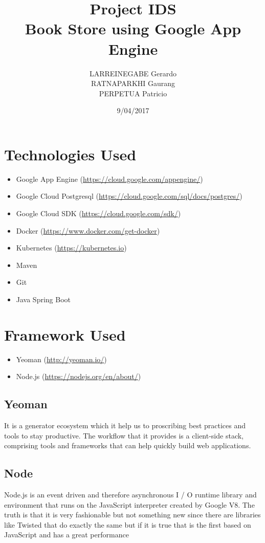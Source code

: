 \documentclass[a4paper]{article}
\title{Project IDS \\
Book Store using Google App Engine}
\author{LARREINEGABE Gerardo \\
RATNAPARKHI Gaurang \\
PERPETUA Patricio}
\date{9/04/2017}
\begin{document}
\maketitle


\section{Technologies Used}
\begin{itemize}
    
    \item Google App Engine (\url{https://cloud.google.com/appengine/})
    \item Google Cloud Postgresql (\url{https://cloud.google.com/sql/docs/postgres/})
    \item Google Cloud SDK (\url{https://cloud.google.com/sdk/})
    \item Docker (\url{https://www.docker.com/get-docker})
    \item Kubernetes (\url{https://kubernetes.io})
    \item Maven 
    \item Git
    \item Java Spring Boot
\end{itemize}

\section{Framework Used}
\begin{itemize}
    \item Yeoman (\url{http://yeoman.io/})
    \item Node.js (\url{https://nodejs.org/en/about/})
\end{itemize}
\subsection{Yeoman}
It is a generator ecosystem which it help us to proscribing best practices and tools to stay productive.
The workflow that it provides is a client-side stack, comprising tools and frameworks that can help quickly build web applications.
\subsection{Node}
Node.js is an event driven and therefore asynchronous I / O runtime library and environment that runs on the JavaScript interpreter created by Google V8. The truth is that it is very fashionable but not something new since there are libraries like Twisted that do exactly the same but if it is true that is the first based on JavaScript and has a great performance
\end{document}
